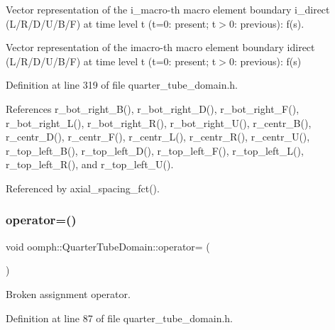 Vector representation of the i\+\_\+macro-\/th macro element boundary i\+\_\+direct (L/\+R/\+D/\+U/\+B/F) at time level t (t=0\+: present; t$>$0\+: previous)\+: f(s). 

Vector representation of the imacro-\/th macro element boundary idirect (L/\+R/\+D/\+U/\+B/F) at time level t (t=0\+: present; t$>$0\+: previous)\+: f(s) 

Definition at line 319 of file quarter\+\_\+tube\+\_\+domain.\+h.



References r\+\_\+bot\+\_\+right\+\_\+\+B(), r\+\_\+bot\+\_\+right\+\_\+\+D(), r\+\_\+bot\+\_\+right\+\_\+\+F(), r\+\_\+bot\+\_\+right\+\_\+\+L(), r\+\_\+bot\+\_\+right\+\_\+\+R(), r\+\_\+bot\+\_\+right\+\_\+\+U(), r\+\_\+centr\+\_\+\+B(), r\+\_\+centr\+\_\+\+D(), r\+\_\+centr\+\_\+\+F(), r\+\_\+centr\+\_\+\+L(), r\+\_\+centr\+\_\+\+R(), r\+\_\+centr\+\_\+\+U(), r\+\_\+top\+\_\+left\+\_\+\+B(), r\+\_\+top\+\_\+left\+\_\+\+D(), r\+\_\+top\+\_\+left\+\_\+\+F(), r\+\_\+top\+\_\+left\+\_\+\+L(), r\+\_\+top\+\_\+left\+\_\+\+R(), and r\+\_\+top\+\_\+left\+\_\+\+U().



Referenced by axial\+\_\+spacing\+\_\+fct().

\mbox{\label{classoomph_1_1QuarterTubeDomain_aad4f59dfaa325e7d8a67ed477114700b}} 
\subsubsection{\texorpdfstring{operator=()}{operator=()}}
{\footnotesize\ttfamily void oomph\+::\+Quarter\+Tube\+Domain\+::operator= (\begin{DoxyParamCaption}\item[{const \hyperlink{classoomph_1_1QuarterTubeDomain}{Quarter\+Tube\+Domain} \&}]{ }\end{DoxyParamCaption})\hspace{0.3cm}{\ttfamily [inline]}}



Broken assignment operator. 



Definition at line 87 of file quarter\+\_\+tube\+\_\+domain.\+h.

\mbox{\label{classoomph_1_1QuarterTubeDomain_aef8a75f0a0790e2a43f2702524a48e60}} 
